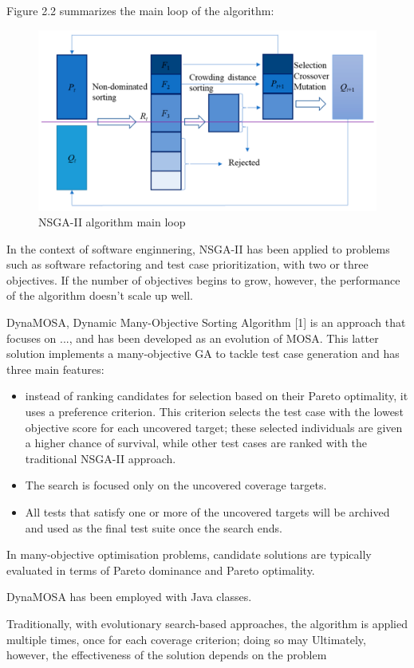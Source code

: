 Figure 2.2 summarizes the main loop of the algorithm:
\begin{figure}[h]
    \centering
    \includegraphics[scale=0.1]{./figures/nsga-ii.png}
    \caption{NSGA-II algorithm main loop}
    \label{fig:NSGA-II algorithm main loop}
\end{figure}


In the context of software enginnering, NSGA-II has been applied to problems such as software refactoring and test case prioritization,
with two or three objectives. If the number of objectives begins to grow, however, the performance of the algorithm doesn't scale up
well.



DynaMOSA, Dynamic Many-Objective Sorting Algorithm [1] is an approach that focuses on ..., and has been developed as an evolution 
of MOSA. This latter solution implements a many-objective GA to tackle test case generation and has three main features: 
\begin{itemize}
    \item instead of ranking candidates for selection based on their Pareto optimality, it uses a preference criterion.
        This criterion selects the test case with the lowest objective score for each uncovered target; these selected individuals
        are given a higher chance of survival, while other test cases are ranked with the traditional NSGA-II approach.
    \item The search is focused only on the uncovered coverage targets.
    \item All tests that satisfy one or more of the uncovered targets will be archived and used as the final test suite once the search ends.
\end{itemize}

In many-objective optimisation problems, candidate solutions are typically evaluated in terms of Pareto dominance and Pareto optimality.


DynaMOSA has been employed with Java classes.

Traditionally, with evolutionary search-based approaches, the algorithm is applied multiple times, 
once for each coverage criterion; doing so may 
Ultimately, however, the effectiveness of the solution depends on the problem